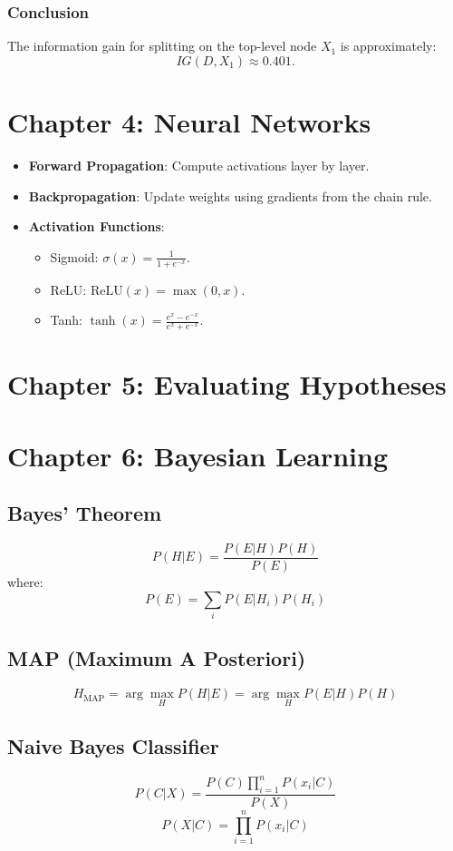 \documentclass[10pt,a4paper]{article}
\begin{document}
\subsubsection*{Conclusion}
The information gain for splitting on the top-level node \(X_1\) is approximately:
\[
IG(D, X_1) \approx 0.401.
\]

\newpage
\section*{Chapter 4: Neural Networks}
\begin{itemize}
	\item \textbf{Forward Propagation}: Compute activations layer by layer.
	\item \textbf{Backpropagation}: Update weights using gradients from the chain rule.
	\item \textbf{Activation Functions}:
	\begin{itemize}
		\item Sigmoid: \( \sigma(x) = \frac{1}{1 + e^{-x}} \).
		\item ReLU: \( \text{ReLU}(x) = \max(0, x) \).
		\item Tanh: \( \tanh(x) = \frac{e^x - e^{-x}}{e^x + e^{-x}} \).
	\end{itemize}
\end{itemize}
\section*{Chapter 5: Evaluating Hypotheses}
\section*{Chapter 6: Bayesian Learning}
\subsection*{Bayes' Theorem}
\[
P(H|E) = \frac{P(E|H)P(H)}{P(E)}
\]
where:
\[
P(E) = \sum_i P(E|H_i)P(H_i)
\]

\subsection*{MAP (Maximum A Posteriori)}
\[
H_{\text{MAP}} = \arg\max_H P(H|E) = \arg\max_H P(E|H)P(H)
\]

\subsection*{Naive Bayes Classifier}
\[
P(C|X) = \frac{P(C)\prod_{i=1}^{n}P(x_i|C)}{P(X)}
\]
\[
P(X|C) = \prod_{i=1}^{n}P(x_i|C)
\]
\end{document}
